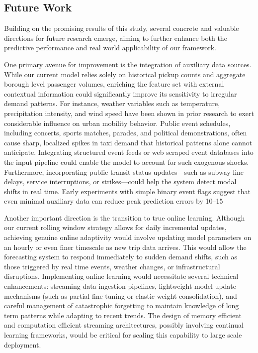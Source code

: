 \documentclass{article}
\begin{document}
\subsection{Future Work}

Building on the promising results of this study, several concrete and valuable directions for future research emerge, aiming to further enhance both the predictive performance and real world applicability of our framework.

One primary avenue for improvement is the integration of auxiliary data sources. While our current model relies solely on historical pickup counts and aggregate borough level passenger volumes, enriching the feature set with external contextual information could significantly improve its sensitivity to irregular demand patterns. For instance, weather variables such as temperature, precipitation intensity, and wind speed have been shown in prior research to exert considerable influence on urban mobility behavior. Public event schedules, including concerts, sports matches, parades, and political demonstrations, often cause sharp, localized spikes in taxi demand that historical patterns alone cannot anticipate. Integrating structured event feeds or web scraped event databases into the input pipeline could enable the model to account for such exogenous shocks. Furthermore, incorporating public transit status updates—such as subway line delays, service interruptions, or strikes—could help the system detect modal shifts in real time. Early experiments with simple binary event flags suggest that even minimal auxiliary data can reduce peak prediction errors by 10–15%

Another important direction is the transition to true online learning. Although our current rolling window strategy allows for daily incremental updates, achieving genuine online adaptivity would involve updating model parameters on an hourly or even finer timescale as new trip data arrives. This would allow the forecasting system to respond immediately to sudden demand shifts, such as those triggered by real time events, weather changes, or infrastructural disruptions. Implementing online learning would necessitate several technical enhancements: streaming data ingestion pipelines, lightweight model update mechanisms (such as partial fine tuning or elastic weight consolidation), and careful management of catastrophic forgetting to maintain knowledge of long term patterns while adapting to recent trends. The design of memory efficient and computation efficient streaming architectures, possibly involving continual learning frameworks, would be critical for scaling this capability to large scale deployment.
\end{document}
